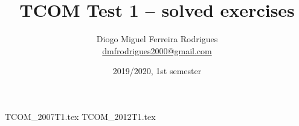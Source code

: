 \documentclass{tcom}
\title{TCOM Test 1 -- solved exercises}
\author{Diogo Miguel Ferreira Rodrigues \\ \href{mailto:dmfrodrigues2000@gmail.com}{dmfrodrigues2000@gmail.com}}
\date{2019/2020, 1st semester}
\begin{document}
\maketitle
\tableofcontents
\setcounter{section}{6}
{TCOM_2007T1.tex}
{TCOM_2012T1.tex}
\end{document}

